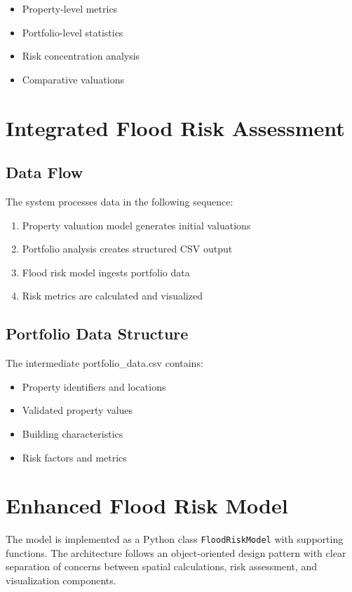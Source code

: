 \documentclass{article}
\begin{document}
\begin{itemize}
    \item Property-level metrics
    \item Portfolio-level statistics
    \item Risk concentration analysis
    \item Comparative valuations
\end{itemize}

\section{Integrated Flood Risk Assessment}

\subsection{Data Flow}
The system processes data in the following sequence:

\begin{enumerate}
    \item Property valuation model generates initial valuations
    \item Portfolio analysis creates structured CSV output
    \item Flood risk model ingests portfolio data
    \item Risk metrics are calculated and visualized
\end{enumerate}

\subsection{Portfolio Data Structure}
The intermediate portfolio\_data.csv contains:

\begin{itemize}
    \item Property identifiers and locations
    \item Validated property values
    \item Building characteristics
    \item Risk factors and metrics
\end{itemize}

\section{Enhanced Flood Risk Model}
The model is implemented as a Python class \texttt{FloodRiskModel} with supporting functions. The architecture follows an object-oriented design pattern with clear separation of concerns between spatial calculations, risk assessment, and visualization components.
\end{document}
